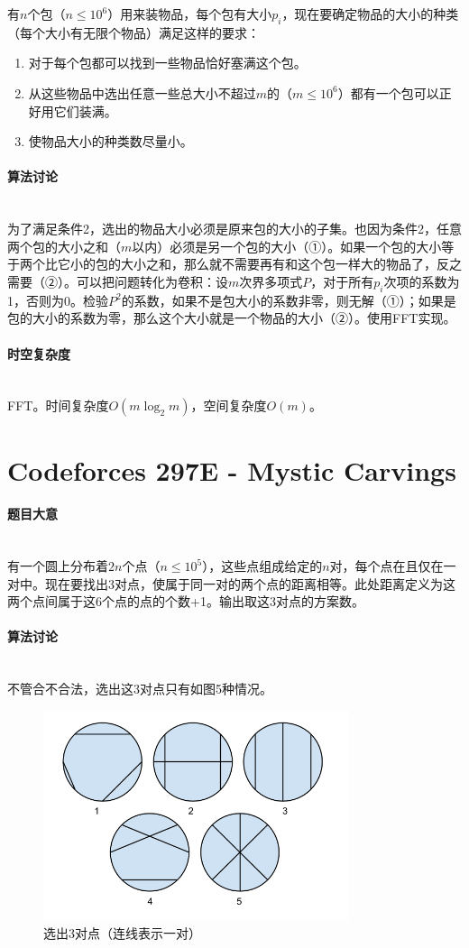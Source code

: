 \documentclass[UTF8]{ctexart}
\newcommand{\myparagraph}[1]{\paragraph{#1}\mbox{}\\}
\theoremstyle{nonumberplain}
\begin{document}
			有$n$个包（$n \leq 10^6$）用来装物品，每个包有大小$p_i$，现在要确定物品的大小的种类（每个大小有无限个物品）满足这样的要求：
			
			\begin{enumerate}
				\item 对于每个包都可以找到一些物品恰好塞满这个包。
				\item 从这些物品中选出任意一些总大小不超过$m$的（$m \leq 10^6$）都有一个包可以正好用它们装满。
				\item 使物品大小的种类数尽量小。
			\end{enumerate}
		
		\myparagraph{算法讨论}
		
			为了满足条件2，选出的物品大小必须是原来包的大小的子集。也因为条件2，任意两个包的大小之和（$m$以内）必须是另一个包的大小（①）。如果一个包的大小等于两个比它小的包的大小之和，那么就不需要再有和这个包一样大的物品了，反之需要（②）。可以把问题转化为卷积：设$m$次界多项式$P$，对于所有$p_i$次项的系数为1，否则为0。检验$P^2$的系数，如果不是包大小的系数非零，则无解（①）；如果是包的大小的系数为零，那么这个大小就是一个物品的大小（②）。使用FFT实现。
		
		\myparagraph{时空复杂度}
		
			FFT。时间复杂度$O(m\log_2m)$，空间复杂度$O(m)$。
	
	\section{Codeforces 297E - Mystic Carvings}
	
		\myparagraph{题目大意}
		
			有一个圆上分布着$2n$个点（$n \leq 10^5$），这些点组成给定的$n$对，每个点在且仅在一对中。现在要找出3对点，使属于同一对的两个点的距离相等。此处距离定义为这两个点间属于这6个点的点的个数+1。输出取这3对点的方案数。
		
		\myparagraph{算法讨论}
		
			不管合不合法，选出这3对点只有如图5种情况。
			
			\begin{figure}[ht]
				\centering
				\includegraphics[width=0.8\textwidth]{fig297e_1.png}
				\caption{选出3对点（连线表示一对）}
			\end{figure}
			
\end{document}
